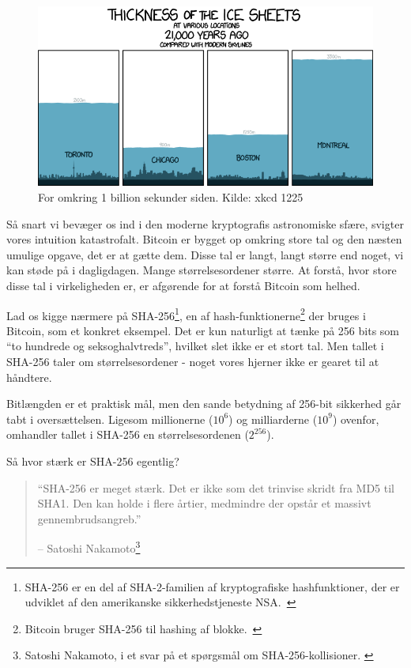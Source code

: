 \documentclass[paper=6in:9in,pagesize=pdftex,headinclude=on,footinclude=on,12pt]{scrbook}
\begin{document}
\begin{figure}
  \includegraphics{assets/images/xkcd-1225.png}
  \caption{For omkring 1 billion sekunder siden. Kilde: xkcd 1225}
  \label{fig:xkcd-1225}
\end{figure}

Så snart vi bevæger os ind i den moderne kryptografis astronomiske sfære, svigter vores intuition katastrofalt. Bitcoin er bygget op omkring store tal og den næsten umulige opgave, det er at gætte dem. Disse tal er langt, langt større end noget, vi kan støde på i dagligdagen. Mange størrelsesordener større. At forstå, hvor store disse tal i virkeligheden er, er afgørende for at forstå Bitcoin som helhed.

Lad os kigge nærmere på SHA-256\footnote{SHA-256 er en del af SHA-2-familien af kryptografiske hashfunktioner, der er udviklet af den amerikanske sikkerhedstjeneste NSA.~\cite{wiki:sha2}}, en af hash-funktionerne\footnote{Bitcoin bruger SHA-256 til hashing af blokke.~\cite{btcwiki:block-hashing}} der bruges i Bitcoin, som et konkret eksempel. Det er kun naturligt at tænke på 256 bits som \enquote{to hundrede og seksoghalvtreds}, hvilket slet ikke er et stort tal. Men tallet i SHA-256 taler om størrelsesordener - noget vores hjerner ikke er gearet til at håndtere.

Bitlængden er et praktisk mål, men den sande betydning af 256-bit sikkerhed går tabt i oversættelsen. Ligesom millionerne ($10^6$) og milliarderne ($10^9$) ovenfor, omhandler tallet i SHA-256 en størrelsesordenen ($2^{256}$).

Så hvor stærk er SHA-256 egentlig?\begin{quotation}\begin{samepage} \enquote{SHA-256 er meget stærk. Det er ikke som det trinvise skridt fra MD5 til SHA1. Den kan holde i flere årtier, medmindre der opstår et massivt gennembrudsangreb.} \begin{flushright} -- Satoshi Nakamoto\footnote{Satoshi Nakamoto, i et svar på et spørgsmål om SHA-256-kollisioner. \cite{satoshi-sha256}}
\end{flushright}\end{samepage}\end{quotation}
\end{document}
